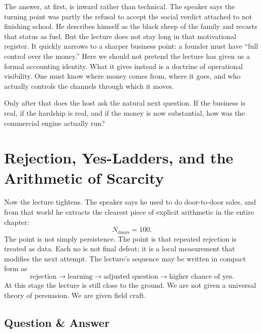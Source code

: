 The answer, at first, is inward rather than technical. The speaker says the turning point was partly the refusal to accept the social verdict attached to not finishing school. He describes himself as the black sheep of the family and recasts that status as fuel. But the lecture does not stay long in that motivational register. It quickly narrows to a sharper business point: a founder must have ``full control over the money.'' Here we should not pretend the lecture has given us a formal accounting identity. What it gives instead is a doctrine of operational visibility. One must know where money comes from, where it goes, and who actually controls the channels through which it moves.

Only after that does the host ask the natural next question. If the business is real, if the hardship is real, and if the money is now substantial, how was the commercial engine actually run?

\section{Rejection, Yes-Ladders, and the Arithmetic of Scarcity}

Now the lecture tightens. The speaker says he used to do door-to-door sales, and from that world he extracts the clearest piece of explicit arithmetic in the entire chapter:
\begin{equation}
N_{\text{doors}} = 100.
\end{equation}
The point is not simply persistence. The point is that repeated rejection is treated as data. Each no is not final defeat; it is a local measurement that modifies the next attempt. The lecture's sequence may be written in compact form as
\begin{equation}
\text{rejection} \to \text{learning} \to \text{adjusted question} \to \text{higher chance of yes}.
\end{equation}
At this stage the lecture is still close to the ground. We are not given a universal theory of persuasion. We are given field craft.

\subsection{Question \& Answer}

